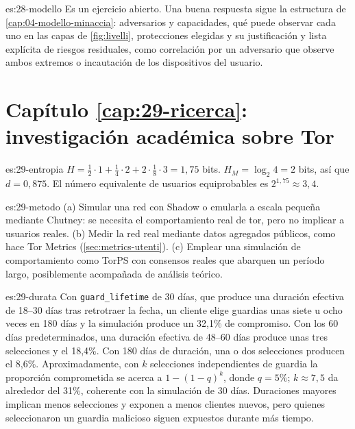 \begin{soluzione}{es:28-modello}
Es un ejercicio abierto. Una buena respuesta sigue la estructura de \cref{cap:04-modello-minaccia}: adversarios y capacidades, qué puede observar cada uno en las capas de \cref{fig:livelli}, protecciones elegidas y su justificación y lista explícita de riesgos residuales, como correlación por un adversario que observe ambos extremos o incautación de los dispositivos del usuario.
\end{soluzione}

\section*{Capítulo \ref{cap:29-ricerca}: investigación académica sobre Tor}

\begin{soluzione}{es:29-entropia}
$H=\tfrac12\cdot1+\tfrac14\cdot2+2\cdot\tfrac18\cdot3=1{,}75$ bits. $H_M=\log_2 4=2$ bits, así que $d=0{,}875$. El número equivalente de usuarios equiprobables es $2^{1{,}75}\approx3{,}4$.
\end{soluzione}

\begin{soluzione}{es:29-metodo}
(a) Simular una red con Shadow o emularla a escala pequeña mediante Chutney: se necesita el comportamiento real de tor, pero no implicar a usuarios reales. (b) Medir la red real mediante datos agregados públicos, como hace Tor Metrics (\cref{sec:metrics-utenti}). (c) Emplear una simulación de comportamiento como TorPS con consensos reales que abarquen un período largo, posiblemente acompañada de análisis teórico.
\end{soluzione}

\begin{soluzione}{es:29-durata}
Con \texttt{guard\_lifetime} de 30 días, que produce una duración efectiva de 18--30 días tras retrotraer la fecha, un cliente elige guardias unas siete u ocho veces en 180 días y la simulación produce un 32,1\% de compromiso. Con los 60 días predeterminados, una duración efectiva de 48--60 días produce unas tres selecciones y el 18,4\%. Con 180 días de duración, una o dos selecciones producen el 8,6\%. Aproximadamente, con $k$ selecciones independientes de guardia la proporción comprometida se acerca a $1-(1-q)^k$, donde $q=5\%$; $k\approx7{,}5$ da alrededor del 31\%, coherente con la simulación de 30 días. Duraciones mayores implican menos selecciones y exponen a menos clientes nuevos, pero quienes seleccionaron un guardia malicioso siguen expuestos durante más tiempo.
\end{soluzione}

